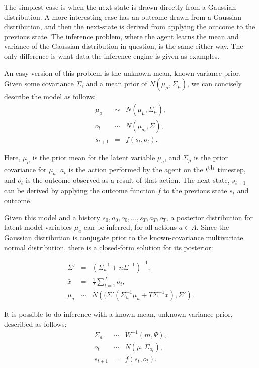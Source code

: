 The simplest case is when the next-state is drawn directly from a Gaussian distribution. A more interesting case has an outcome drawn from a Gaussian distribution, and then the next-state is derived from applying the outcome to the previous state. The inference problem, where the agent learns the mean and variance of the Gaussian distribution in question, is the same either way. The only difference is what data the inference engine is given as examples.

An easy version of this problem is the unknown mean, known variance prior. Given some covariance $\Sigma$, and a mean prior of $N(\mu_\mu, \Sigma_\mu)$, we can concisely describe the model as follows:
\begin{eqnarray}
\mu_a &\sim& N(\mu_\mu, \Sigma_\mu),\\
o_t &\sim& N(\mu_{a_t}, \Sigma),\\
s_{t+1} &=& f(s_t, o_t).
\end{eqnarray}

Here, $\mu_\mu$ is the prior mean for the latent variable $\mu_a$, and $\Sigma_\mu$ is the prior covariance for $\mu_a$. $a_t$ is the action performed by the agent on the $t^{\mbox{\small th}}$ timestep, and $o_t$ is the outcome observed as a result of that action. The next state, $s_{t+1}$ can be derived by applying the outcome function $f$ to the previous state $s_t$ and outcome.

Given this model and a history $s_0, a_0, o_0, ..., s_T, a_T, o_T$, a posterior distribution for latent model variables $\mu_a$ can be inferred, for all actions $a \in A$. Since the Gaussian distribution is conjugate prior to the known-covariance multivariate normal distribution, there is a closed-form solution for its posterior:

\begin{eqnarray}
\Sigma' &=& \left(\Sigma_u^{-1}+n\Sigma^{-1}\right)^{-1},\\
\bar x &=& \frac 1 T \sum_{t=1}^T o_t,\\
\mu_a &\sim& N\left((\Sigma'\left(\Sigma_u^{-1}\mu_u+T\Sigma^{-1}\bar x\right), \Sigma'\right).
\end{eqnarray}

It is possible to do inference with a known mean, unknown variance prior, described as follows:
\begin{eqnarray}
\Sigma_a &\sim& W^{-1}(m, \Psi),\\
o_t &\sim& N(\mu, \Sigma_{a_t}),\\
s_{t+1} &=& f(s_t, o_t).
\end{eqnarray}

